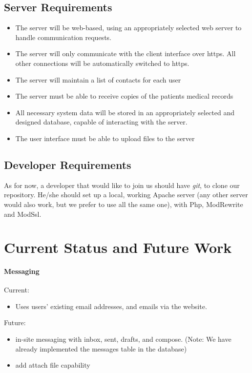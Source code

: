 \section{Server Requirements}
\begin{itemize}
\item The server will be web-based, using an appropriately selected web server to handle communication requests.
\item The server will only communicate with the client interface over https.  All other connections will be automatically switched to https.
\item The server will maintain a list of contacts for each user
\item The server must be able to receive copies of the patients medical records
\item All necessary system data will be stored in an appropriately selected and designed database, capable of interacting with the server.
\item The user interface must be able to upload files to the server
\end{itemize}

\section{Developer Requirements}
As for now, a developer that would like to join us should have \emph{git}, to clone our repository. He/she should set up a local, working Apache server (any other server would also work, but we prefer to use all the same one), with Php, ModRewrite and ModSsl.



\chapter{Current Status and Future Work}

\subsubsection{Messaging}
Current: 
\begin{itemize}
\item Uses users' existing email addresses, and emails via the website. 
\end{itemize}
Future: 
\begin{itemize}
\item in-site messaging with inbox, sent, drafts, and compose. (Note: We have already implemented the messages table in the database)
\item add attach file capability
\end{itemize}


